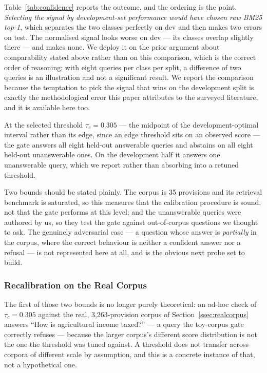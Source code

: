 \documentclass[conference]{IEEEtran}
\begin{document}
Table~\ref{tab:confidence} reports the outcome, and the ordering is the point.
\emph{Selecting the signal by development-set performance would have chosen raw
BM25 top-1}, which separates the two classes perfectly on dev and then makes two
errors on test. The normalised signal looks worse on dev --- its classes
overlap slightly there --- and makes none. We deploy it on the prior argument
about comparability stated above rather than on this comparison, which is the
correct order of reasoning: with eight queries per class per split, a difference
of two queries is an illustration and not a significant result. We report the
comparison because the temptation to pick the signal that wins on the
development split is exactly the methodological error this paper attributes to
the surveyed literature, and it is available here too.

At the selected threshold $\tau_c = 0.305$ --- the midpoint of the
development-optimal interval rather than its edge, since an edge threshold sits
on an observed score --- the gate answers all eight held-out answerable queries
and abstains on all eight held-out unanswerable ones. On the development half it
answers one unanswerable query, which we report rather than absorbing into a
retuned threshold.

Two bounds should be stated plainly. The corpus is 35 provisions and its
retrieval benchmark is saturated, so this measures that the calibration
procedure is sound, not that the gate performs at this level; and the
unanswerable queries were authored by us, so they test the gate against
out-of-corpus questions we thought to ask. The genuinely adversarial case --- a
question whose answer is \emph{partially} in the corpus, where the correct
behaviour is neither a confident answer nor a refusal --- is not represented
here at all, and is the obvious next probe set to build.

\subsubsection{Recalibration on the Real Corpus}
\label{sssec:confidence-real}

The first of those two bounds is no longer purely theoretical: an
ad-hoc check of $\tau_c = 0.305$ against the real, 3{,}263-provision corpus of
Section~\ref{ssec:realcorpus} answers ``How is agricultural income taxed?''
--- a query the toy-corpus gate correctly refuses --- because the larger
corpus's different score distribution is not the one the threshold was tuned
against. A threshold does not transfer across corpora of different scale by
assumption, and this is a concrete instance of that, not a hypothetical one.
\end{document}
